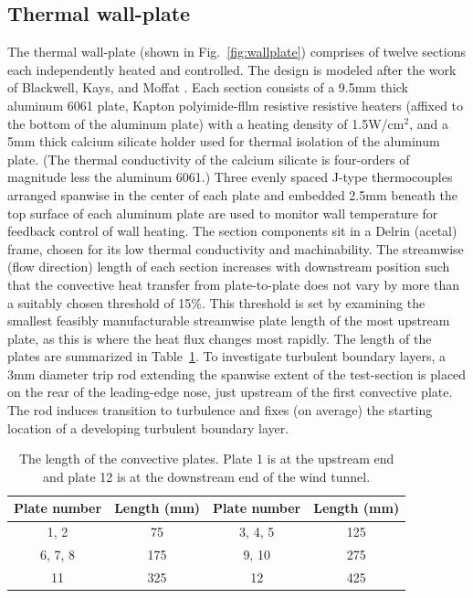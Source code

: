 \subsection{Thermal wall-plate}
The thermal wall-plate (shown in Fig.~\ref{fig:wallplate}) comprises of twelve sections each independently heated and controlled. The design is modeled after the work of Blackwell, Kays, and Moffat \cite{Blackwell_1972}. Each section consists of a 9.5mm thick aluminum 6061 plate, Kapton polyimide-fllm resistive resistive heaters (affixed to the bottom of the aluminum plate) with a heating density of 1.5W/cm$^2$, and a 5mm thick calcium silicate holder used for thermal isolation of the aluminum plate. (The thermal conductivity of the calcium silicate is four-orders of magnitude less the aluminum 6061.) Three evenly spaced J-type thermocouples arranged spanwise in the center of each plate and embedded 2.5mm beneath the top surface of each aluminum plate are used to monitor wall temperature for feedback control of wall heating. The section components sit in a Delrin (acetal) frame, chosen for its low thermal conductivity and machinability. The streamwise (flow direction) length of each section increases with downstream position such that the convective heat transfer from plate-to-plate does not vary by more than a suitably chosen threshold of 15\%. This threshold is set by examining the smallest feasibly manufacturable streamwise plate length of the most upstream plate, as this is where the heat flux changes most rapidly. The length of the plates are summarized in Table~\ref{tab:plate}. To investigate turbulent boundary layers, a 3mm diameter trip rod extending the spanwise extent of the test-section is placed on the rear of the leading-edge nose, just upstream of the first convective plate. The rod induces transition to turbulence and fixes (on average) the starting location of a developing turbulent boundary layer.

\begin{table}[h] 
\centering
\caption{\indent The length of the convective plates. Plate 1 is at the upstream end and plate 12 is at the downstream end of the wind tunnel.}
\begin{tabular}{|c|c|c|c|}
	\hline
	 Plate number& Length (mm) & Plate number& Length (mm)\\ \hline
	1, 2& 75 & 3, 4, 5 & 125 \\ \hline
	6, 7, 8 & 175 & 9, 10 & 275 \\ \hline
	11 & 325 & 12 & 425 \\ \hline                                                       
\end{tabular}
\label{tab:plate}
\end{table}

